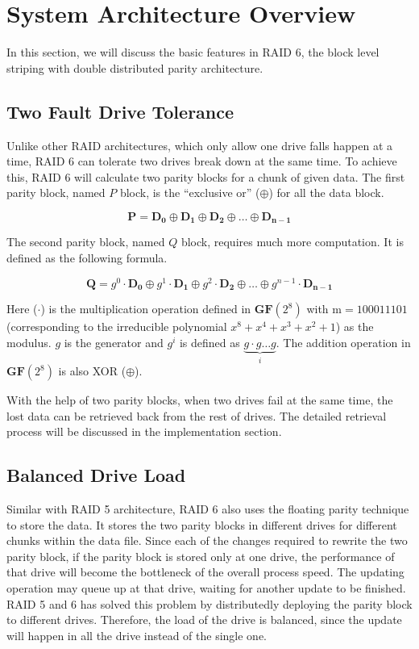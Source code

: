 \section{System Architecture Overview}

In this section, we will discuss the basic features in RAID 6, the block level striping with double distributed parity architecture.

\subsection{Two Fault Drive Tolerance}
Unlike other RAID architectures, which only allow one drive falls happen at a time, RAID 6 can tolerate two drives break down at the same time. To achieve this, RAID 6 will calculate two parity blocks for a chunk of given data. The first parity block, named $P$ block, is the ``exclusive or'' ($\oplus$) for all the data block. 

\begin{equation}\label{eq:gen_p}
	\mathbf{P = D_0 \oplus D_1 \oplus D_2 \oplus \ldots \oplus D_{n-1}}
\end{equation}

The second parity block, named $Q$ block, requires much more computation. It is defined as the following formula.

\begin{equation}\label{eq:gen_q}
	\mathbf{Q} = g^0\cdot \mathbf{D_0} \oplus g^1\cdot \mathbf{D_1} \oplus g^2\cdot \mathbf{D_2} \oplus \ldots \oplus g^{n-1}\cdot \mathbf{D_{n-1}}
\end{equation}

Here ($\cdot$) is the multiplication operation defined in $\mathbf{GF}(2^8)$ with $\mathrm{m}=100011101$ (corresponding to the irreducible polynomial $x^8+x^4+x^3+x^2+1$) as the modulus. $g$ is the generator and $g^{i}$ is defined as $\underbrace{g\cdot g\ldots g}_{i}$. The addition operation in $\mathbf{GF}(2^8)$ is also XOR ($\oplus$).

With the help of two parity blocks, when two drives fail at the same time, the lost data can be retrieved back from the rest of drives. The detailed retrieval process will be discussed in the implementation section.


\subsection{Balanced Drive Load}
Similar with RAID 5 architecture, RAID 6 also uses the floating parity technique to store the data. It stores the two parity blocks in different drives for different chunks within the data file. Since each of the changes required to rewrite the two parity block, if the parity block is stored only at one drive, the performance of that drive will become the bottleneck of the overall process speed. The updating operation may queue up at that drive, waiting for another update to be finished. RAID 5 and 6 has solved this problem by distributedly deploying the parity block to different drives. Therefore, the load of the drive is balanced, since the update will happen in all the drive instead of the single one.

